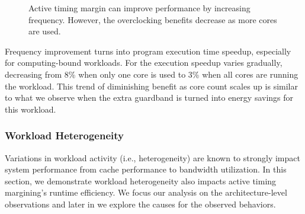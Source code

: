 \begin{figure}
\centering
    \caption{Active timing margin can improve performance by increasing frequency. However, the overclocking benefits decrease as more cores are used.}
    \label{fig:lucb-inefficiency}
 \end{figure}

Frequency improvement turns into program execution time speedup, especially for computing-bound workloads. For  the execution speedup varies gradually, decreasing from 8\% when only one core is used to 3\% when all cores are running the workload. This trend of diminishing benefit as core count scales up is similar to what we observe when the extra guardband is turned into energy savings for this workload. 

\subsubsection{Workload Heterogeneity}
\label{sec:ams:characterization:workload-variation}

Variations in workload activity (i.e., heterogeneity) are known to strongly impact system performance from cache performance to bandwidth utilization. In this section, we demonstrate workload heterogeneity also impacts active timing margining's runtime efficiency. We focus our analysis on the architecture-level observations and later in  we explore the causes for the observed behaviors.

